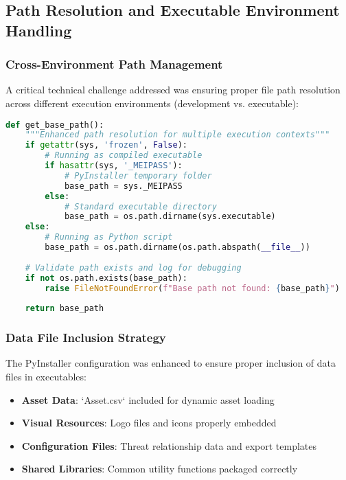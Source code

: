 \documentclass[binding=0.6cm]{sapthesis}
\begin{document}
\subsection{Path Resolution and Executable Environment Handling}

\subsubsection{Cross-Environment Path Management}

A critical technical challenge addressed was ensuring proper file path resolution across different execution environments (development vs. executable):

\begin{lstlisting}[language=Python, caption=Robust Path Resolution Implementation]
def get_base_path():
    """Enhanced path resolution for multiple execution contexts"""
    if getattr(sys, 'frozen', False):
        # Running as compiled executable
        if hasattr(sys, '_MEIPASS'):
            # PyInstaller temporary folder
            base_path = sys._MEIPASS
        else:
            # Standard executable directory
            base_path = os.path.dirname(sys.executable)
    else:
        # Running as Python script
        base_path = os.path.dirname(os.path.abspath(__file__))
    
    # Validate path exists and log for debugging
    if not os.path.exists(base_path):
        raise FileNotFoundError(f"Base path not found: {base_path}")
    
    return base_path
\end{lstlisting}

\subsubsection{Data File Inclusion Strategy}

The PyInstaller configuration was enhanced to ensure proper inclusion of data files in executables:

\begin{itemize}
    \item \textbf{Asset Data}: `Asset.csv` included for dynamic asset loading
    \item \textbf{Visual Resources}: Logo files and icons properly embedded
    \item \textbf{Configuration Files}: Threat relationship data and export templates
    \item \textbf{Shared Libraries}: Common utility functions packaged correctly
\end{itemize}
\end{document}
